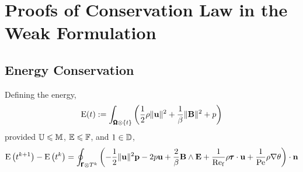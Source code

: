 \chapter{Proofs of Conservation Law in the Weak Formulation}\label{cha:weak conservation proofs}
    \section*{Energy Conservation}
        \begin{theorem*}
            Defining the energy,
            \begin{equation}
                \mathrm{E}(t)  :=  \int_{\pmb{\mathsf{\Omega}}\otimes\{t\}}\left(\frac{1}{2}\rho\|\mathbf{u}\|^{2} + \frac{1}{\beta}\|\mathbf{B}\|^{2} + p\right)
            \end{equation}
            provided $\mathbb{U}  \leqslant  \mathbb{M}$, $\mathbb{E} 
             \leqslant  \mathbb{F}$, and $1  \in  \mathbb{D}$,
            \begin{equation}
                \mathrm{E}\left(t^{k + 1}\right) - \mathrm{E}\left(t^{k}\right)  =  \oint_{\pmb{\mathsf{\Gamma}}\otimes T^{k}}\left(- \frac{1}{2}\|\mathbf{u}\|^{2}\mathbf{p} - 2p\mathbf{u} + \frac{2}{\beta}\mathbf{B}\wedge\mathbf{E} + \frac{1}{\mathrm{Re}_{\mathrm{f}}}\rho\pmb{\mathsf{\tau}}\cdot\mathbf{u} + \frac{1}{\mathrm{Pe}}\rho\nabla\theta\right)\cdot\mathbf{n}
            \end{equation}
        \end{theorem*}
